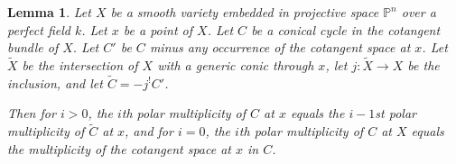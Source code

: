 \documentclass[12pt]{amsart}
\newtheorem{lemma}[theorem]{Lemma}
\theoremstyle{definition}
\theoremstyle{remark}
\newcommand{\inhyper}[1] {\tilde{#1}}
\begin{document}
\begin{lemma}\label{multiplicity-hypersurface}  Let $X$ be a smooth variety embedded in projective space $\mathbb P^n$ over a perfect field $k$. Let $x$ be a point of $X$. Let $C$ be a conical cycle in the cotangent bundle of $X$.  Let $C'$ be $C$ minus any occurrence of the cotangent space at $x$.  Let $\inhyper{X}$ be the intersection of $X$ with a generic conic through $x$, let $j: \tilde{X} \to X$ be the inclusion, and let $\tilde{C} =-  j^{!} C'$.  


Then for $i>0$, the $i$th polar multiplicity of $C$ at $x$ equals the $i-1$st polar multiplicity of $\inhyper{C}$ at $x$, and for $i=0$, the $i$th polar multiplicity of $C$ at $X$ equals the multiplicity of the cotangent space at $x$ in $C$. \end{lemma}
\end{document}
